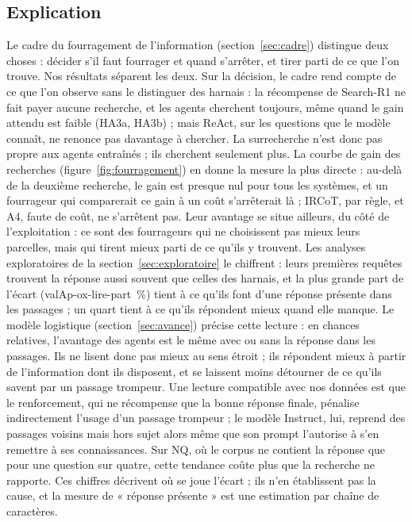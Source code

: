 \documentclass[11pt,a4paper]{article}
\newcommand{\valAp}[1]{\csname valAp-#1\endcsname}             %
\begin{document}
\subsection{Explication}
Le cadre du fourragement de l'information (section~\ref{sec:cadre}) distingue deux choses : décider s'il faut fourrager et quand s'arrêter, et tirer parti de ce que l'on trouve. Nos résultats séparent les deux. Sur la décision, le cadre rend compte de ce que l'on observe sans le distinguer des harnais : la récompense de Search-R1 ne fait payer aucune recherche, et les agents cherchent toujours, même quand le gain attendu est faible (HA3a, HA3b) ; mais ReAct, sur les questions que le modèle connaît, ne renonce pas davantage à chercher. La surrecherche n'est donc pas propre aux agents entraînés ; ils cherchent seulement plus. La courbe de gain des recherches (figure~\ref{fig:fourragement}) en donne la mesure la plus directe : au-delà de la deuxième recherche, le gain est presque nul pour tous les systèmes, et un fourrageur qui comparerait ce gain à un coût s'arrêterait là ; IRCoT, par règle, et A4, faute de coût, ne s'arrêtent pas. Leur avantage se situe ailleurs, du côté de l'exploitation : ce sont des fourrageurs qui ne choisissent pas mieux leurs parcelles, mais qui tirent mieux parti de ce qu'ils y trouvent. Les analyses exploratoires de la section~\ref{sec:exploratoire} le chiffrent : leurs premières requêtes trouvent la réponse aussi souvent que celles des harnais, et la plus grande part de l'écart (\valAp{ox-lire-part}~\%) tient à ce qu'ils font d'une réponse présente dans les passages ; un quart tient à ce qu'ils répondent mieux quand elle manque. Le modèle logistique (section~\ref{sec:avance}) précise cette lecture : en chances relatives, l'avantage des agents est le même avec ou sans la réponse dans les passages. Ils ne lisent donc pas mieux au sens étroit ; ils répondent mieux à partir de l'information dont ils disposent, et se laissent moins détourner de ce qu'ils savent par un passage trompeur. Une lecture compatible avec nos données est que le renforcement, qui ne récompense que la bonne réponse finale, pénalise indirectement l'usage d'un passage trompeur ; le modèle Instruct, lui, reprend des passages voisins mais hors sujet alors même que son prompt l'autorise à s'en remettre à ses connaissances. Sur NQ, où le corpus ne contient la réponse que pour une question sur quatre, cette tendance coûte plus que la recherche ne rapporte. Ces chiffres décrivent où se joue l'écart ; ils n'en établissent pas la cause, et la mesure de « réponse présente » est une estimation par chaîne de caractères.
\end{document}
